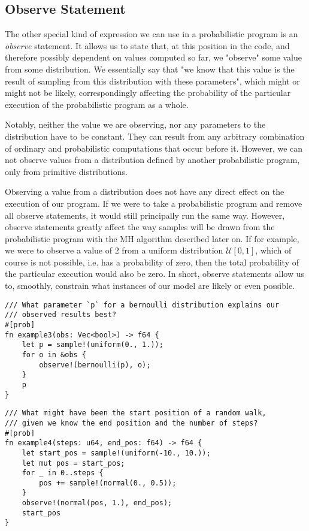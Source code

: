 \subsection{Observe Statement}

The other special kind of expression we can use in a probabilistic program is an \textit{observe} statement. It allows us to state that, at this position in the code, and therefore possibly dependent on values computed so far, we "observe" some value from some distribution. We essentially say that "we know that this value is the result of sampling from this distribution with these parameters", which might or might not be likely, correspondingly affecting the probability of the particular execution of the probabilistic program as a whole. 

Notably, neither the value we are observing, nor any parameters to the distribution have to be constant. They can result from any arbitrary combination of ordinary and probabilistic computations that occur before it. However, we can not observe values from a distribution defined by another probabilistic program, only from primitive distributions.

Observing a value from a distribution does not have any direct effect on the execution of our program. If we were to take a probabilistic program and remove all observe statements, it would still principally run the same way. However, observe statements greatly affect the way samples will be drawn from the probabilistic program with the MH algorithm described later on. If for example, we were to observe a value of $2$ from a uniform distribution $\mathcal{U}[0,1]$, which of course is not possible, i.e. has a probability of zero, then the total probability of the particular execution would also be zero. In short, observe statements allow us to, smoothly, constrain what instances of our model are likely or even possible.

\begin{minipage}{\linewidth}
\begin{lstlisting}
/// What parameter `p` for a bernoulli distribution explains our
/// observed results best?
#[prob]
fn example3(obs: Vec<bool>) -> f64 {
    let p = sample!(uniform(0., 1.));
    for o in &obs {
        observe!(bernoulli(p), o);
    }
    p
}
\end{lstlisting}
\end{minipage}

\begin{minipage}{\linewidth}
\begin{lstlisting}
/// What might have been the start position of a random walk,
/// given we know the end position and the number of steps?
#[prob]
fn example4(steps: u64, end_pos: f64) -> f64 {
    let start_pos = sample!(uniform(-10., 10.));
    let mut pos = start_pos;
    for _ in 0..steps {
        pos += sample!(normal(0., 0.5));
    }
    observe!(normal(pos, 1.), end_pos);
    start_pos
}
\end{lstlisting}
\end{minipage}


